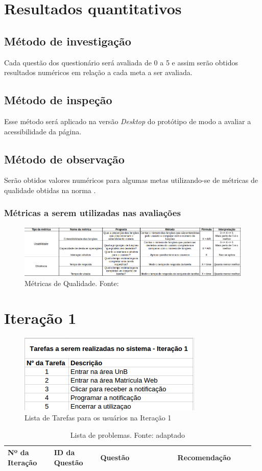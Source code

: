 \section{Resultados quantitativos}

  \subsection{Método de investigação}
  Cada questão dos questionário será avaliada de 0 a 5 e assim serão obtidos resultados numéricos
  em relação a cada meta a ser avaliada.

  
  \subsection{Método de inspeção}
  Esse método será aplicado na versão \textit{Desktop} do protótipo de modo a avaliar a acessibilidade da página.
  
  \subsection{Método de observação}
  Serão obtidos valores numéricos para algumas metas utilizando-se de métricas de qualidade obtidas na
  norma .
  
\vfill
\pagebreak
\subsubsection{Métricas a serem utilizadas nas avaliações}
\begin{figure}[!h]
  \centering
    \includegraphics[keepaspectratio=true, scale=0.6, angle=-90]{figuras/qualidade.png}
  \caption{Métricas de Qualidade. Fonte: \cite{iso}}
\end{figure}

\pagebreak

\section{Iteração 1}

\begin{figure}[h!]
  \centering
    \includegraphics[keepaspectratio=true, scale=0.7]{figuras/tarefas1.png}
  \caption{Lista de Tarefas para os usuários na Iteração 1}
\end{figure}

\begin{table}[!h]
\caption{Lista de problemas. Fonte: \cite{preece} adaptado}
\label{Rotulo}
  \begin{tabular}{p{0.18\linewidth}p{0.18\linewidth}p{0.30\linewidth}p{0.30\linewidth}}
  \hline
    Nº da Iteração & ID da Questão & Questão & Recomendação\\
 \hline
  \end{tabular}
\end{table}